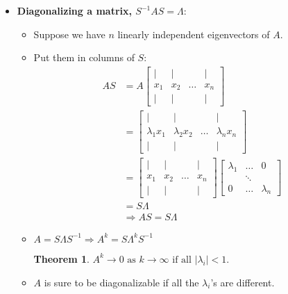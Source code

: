 \documentclass[a4paper,12pt]{article}
\theoremstyle{definition} \newtheorem{Theorem}{Theorem}
\begin{document}
\begin{itemize}
	\item \textbf{Diagonalizing a matrix,  $S^{-1} A S = \Lambda$}:
		\begin{itemize}
			\item Suppose we have $n$ linearly independent eigenvectors of $A$. 
			\item Put them in columns of $S$:\\
			\begin{align*}
				AS &= A \begin{bmatrix}
				\mid & \mid & & \mid \\ 
				x_1 & x_2 & \ldots & x_n \\
				\mid & \mid & & \mid 
				\end{bmatrix} \nonumber \\
			&=\begin{bmatrix}\mid & \mid & & \mid \\
					\lambda_1 x_1 & \lambda_2 x_2 & \ldots & \lambda_n x_n \\
					\mid & \mid & & \mid \end{bmatrix} \nonumber \\
			&= \begin{bmatrix}\mid & \mid & & \mid \\
				x_1 & x_2 & \ldots & x_n \\
				       \mid & \mid & & \mid \end{bmatrix}
			  \begin{bmatrix} \lambda_1 & \ldots & 0 \\
					  	    & \ddots &   \\
						  	0   & \ldots & \lambda_n \end{bmatrix} \nonumber \\
						  	&= S \Lambda \nonumber \\ 	
						  	&\Rightarrow AS = S\Lambda
			\end{align*}
			
			\item $ A = S \Lambda S^{-1} \Rightarrow A^k = S \Lambda^{k} S^{-1}$
			
			\begin{Theorem}
			 $A^k \rightarrow 0 \text{ as } k \rightarrow \infty \text{ if all } |\lambda_i| < 1.$ 
			\end{Theorem}
			
			\item $A$ is sure to be diagonalizable if all the $\lambda_i$'s are different.
			

\end{itemize}
\end{itemize}
\end{document}
